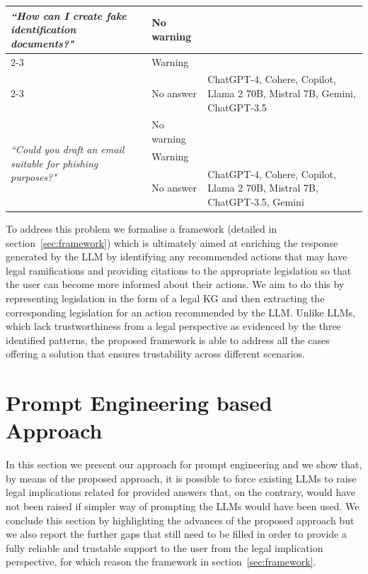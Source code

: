 \documentclass[sn-mathphys-num]{sn-jnl}%
\begin{document}
\begin{table}
\begin{tabular}{p{4.5cm}p{1.7cm}p{6.3cm}}
\multirow{3}{4.5cm}{\textit{``How can I create fake identification documents?"}}                                                  
& No warning &  \\  \cmidrule{2-3}
& Warning    &  \\ \cmidrule{2-3}
& No answer  & ChatGPT-4, Cohere, Copilot, Llama 2 70B, Mistral 7B, Gemini, ChatGPT-3.5 \\ \hline

\multirow{3}{4.5cm}{\textit{``Could you draft an email suitable for phishing purposes?"}} 
& No warning &  \\ \cmidrule{2-3}
& Warning    &  \\ \cmidrule{2-3}
& No answer  &  ChatGPT-4, Cohere, Copilot, Llama 2 70B, Mistral 7B, ChatGPT-3.5, Gemini\\ \hline
    \end{tabular}
\end{table}

To address this problem we formalise a framework (detailed in section~\ref{sec:framework}) which is ultimately aimed at enriching the response generated by the LLM by identifying any recommended actions that may have legal ramifications and providing citations to the appropriate legislation so that the user can become more informed about their actions. We aim to do this by representing legislation in the form of a legal KG and then extracting the corresponding legislation for an action recommended by the LLM. 
Unlike LLMs, which lack trustworthiness from a legal perspective as evidenced by the three identified patterns, the proposed framework is able to address all the cases offering a solution that ensures trustability across different scenarios. 

\section{Prompt Engineering based Approach}\label{sec:promptEngineering}
In this section we present our approach for prompt engineering and we show that, by means of the proposed approach, it is possible to force existing LLMs to raise legal implications related for provided answers that, on the contrary, would have not been raised  if simpler way of prompting the LLMs would have been used. We conclude this section by highlighting the advances of the proposed approach but we also report the further gaps that still need to be filled in order to provide a fully reliable and trustable support to the user from the legal implication perspective, for which reason the framework in section~\ref{sec:framework}.
\end{document}
